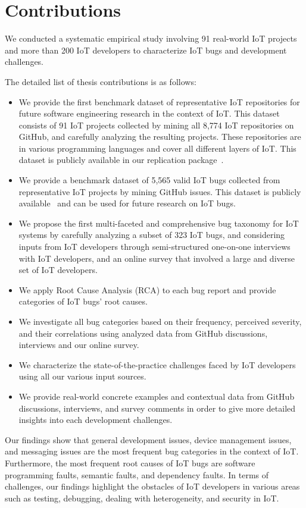 \section{Contributions}
We conducted a systematic empirical study involving 91 real-world IoT projects and more than 200 IoT developers to characterize IoT bugs and development challenges. 

The detailed list of thesis contributions is as follows:
\begin{itemize}
\item {We provide the first benchmark dataset of representative IoT repositories for future software engineering research in the context of IoT. This dataset consists of 91 IoT projects collected by mining all 8,774 IoT repositories on GitHub, and carefully analyzing the resulting projects. These repositories are in various programming languages and cover all different layers of IoT. This dataset is publicly available in our replication package~\cite{repPack}}.
\item {We provide a benchmark dataset of 5,565 valid IoT bugs collected from representative IoT projects by mining GitHub issues. This dataset is publicly available~\cite{repPack} and can be used for future research on IoT bugs.}
\item {We propose the first multi-faceted and comprehensive bug taxonomy for IoT systems by carefully analyzing a subset of 323 IoT bugs, and considering inputs from IoT developers through semi-structured one-on-one interviews with IoT developers, and an online survey that involved a large and diverse set of IoT developers.}
\item {We apply Root Cause Analysis (RCA) to each bug report and provide categories of IoT bugs' root causes.}
\item{We investigate all bug categories based on their frequency, perceived severity, and their correlations using analyzed data from GitHub discussions, interviews and our online survey.}
\item {We characterize the state-of-the-practice challenges faced by IoT developers using all our various input sources.} 
\item{We provide real-world concrete examples and contextual data from GitHub discussions, interviews, and survey comments in order to give more detailed insights into each development challenges.}
\end{itemize}

Our findings show that general development issues, device management issues, and messaging issues are the most frequent bug categories in the context of IoT. Furthermore, the most frequent root causes of IoT bugs are software programming faults, semantic faults, and dependency faults. In terms of challenges, our findings highlight the obstacles of IoT developers in various areas such as testing, debugging, dealing with heterogeneity, and security in IoT. 

